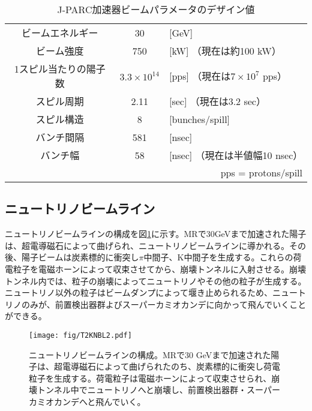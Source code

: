 \documentclass[11pt]{ltjsreport}
\newcommand{\figref}[1]{図\ref{#1}}
\begin{document}
\begin{table}[htbp]
\caption[J-PARC加速器ビームパラメータのデザイン値]{J-PARC加速器ビームパラメータのデザイン値}
\begin{center}
\begin{tabular}{ccl}
\hline \hline
ビームエネルギー & 30 & [GeV]\\
ビーム強度 & 750 &[kW] （現在は約100 kW）\\
1スピル当たりの陽子数 & $3.3 \times 10^{14}$ & [pps] （現在は$7\times10^{7}$ pps）\\
スピル周期 & 2.11 & [sec] （現在は3.2 sec）\\
スピル構造 & 8 &[bunches/spill]\\
バンチ間隔 & 581 & [nsec]\\
バンチ幅 & 58 & [nsec] （現在は半値幅10 nsec）\\
\hline \hline
\multicolumn{3}{r}{pps = protons/spill}\\
\end{tabular}
\end{center}
\label{JPARCBeamlineSpec}
\end{table}%

\newpage
\subsection{ニュートリノビームライン}
ニュートリノビームラインの構成を\figref{T2KNeutrinoBeamline}に示す。MRで30GeVまで加速された陽子は、超電導磁石によって曲げられ、ニュートリノビームラインに導かれる。その後、陽子ビームは炭素標的に衝突し$\pi$中間子、K中間子を生成する。これらの荷電粒子を電磁ホーンによって収束させてから、崩壊トンネルに入射させる。崩壊トンネル内では、粒子の崩壊によってニュートリノやその他の粒子が生成する。ニュートリノ以外の粒子はビームダンプによって堰き止められるため、ニュートリノのみが、前置検出器群よびスーパーカミオカンデに向かって飛んでいくことができる。

\begin{figure}[htbp]
\centering
\texttt{[image: fig/T2KNBL2.pdf]}
\caption[ニュートリノビームラインの構成]{ニュートリノビームラインの構成。MRで30 GeVまで加速された陽子は、超電導磁石によって曲げられたのち、炭素標的に衝突し荷電粒子を生成する。荷電粒子は電磁ホーンによって収束させられ、崩壊トンネル中でニュートリノへと崩壊し、前置検出器群・スーパーカミオカンデへと飛んでいく。}
\label{T2KNeutrinoBeamline}
\end{figure}

\end{document}
